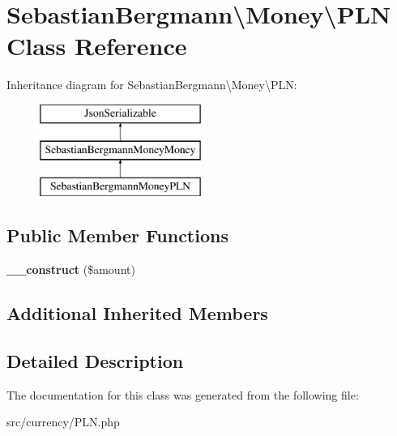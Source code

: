 \hypertarget{classSebastianBergmann_1_1Money_1_1PLN}{}\section{Sebastian\+Bergmann\textbackslash{}Money\textbackslash{}P\+L\+N Class Reference}
\label{classSebastianBergmann_1_1Money_1_1PLN}
Inheritance diagram for Sebastian\+Bergmann\textbackslash{}Money\textbackslash{}P\+L\+N\+:\begin{figure}[H]
\begin{center}
\leavevmode
\includegraphics[height=3.000000cm]{classSebastianBergmann_1_1Money_1_1PLN}
\end{center}
\end{figure}
\subsection*{Public Member Functions}
\begin{DoxyCompactItemize}
\item 
\hypertarget{classSebastianBergmann_1_1Money_1_1PLN_a6a211e353c363dbe4098a96a94579907}{}{\bfseries \+\_\+\+\_\+construct} (\$amount)\label{classSebastianBergmann_1_1Money_1_1PLN_a6a211e353c363dbe4098a96a94579907}

\end{DoxyCompactItemize}
\subsection*{Additional Inherited Members}


\subsection{Detailed Description}


The documentation for this class was generated from the following file\+:\begin{DoxyCompactItemize}
\item 
src/currency/P\+L\+N.\+php\end{DoxyCompactItemize}
